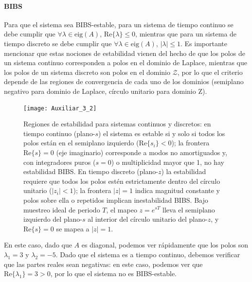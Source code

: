 \documentclass[
  11pt,
  letterpaper,
   addpoints,
   answers
  ]{exam}
\begin{document}
\begin{questions}
\begin{solution}
\paragraph*{BIBS}
Para que el sistema sea BIBS-estable, para un sistema de tiempo continuo se debe cumplir que $\forall \lambda \in \mathrm{eig}(A)$, $\mathrm{Re}\{\lambda\}\le 0$, mientras que para un sistema de tiempo discreto se debe cumplir que $\forall \lambda \in \mathrm{eig}(A)$, $|\lambda|\le 1$. Es importante mencionar que estas nociones de estabilidad vienen del hecho de que los polos de un sistema continuo corresponden a polos en el dominio de Laplace, mientras que los polos de un sistema discreto son polos en el dominio $\mathcal{Z}$, por lo que el criterio depende de las regiones de convergencia de cada uno de los dominios (semiplano negativo para dominio de Laplace, círculo unitario para dominio Z).

\begin{figure}[H]
  \centering
  \texttt{[image: Auxiliar\_3\_2]}
  \caption{Regiones de estabilidad para sistemas continuos y discretos: en tiempo continuo (plano-$s$) el sistema es estable si y solo si todos los polos están en el semiplano izquierdo ($\mathrm{Re}\{s_i\}<0$); la frontera $\mathrm{Re}\{s\}=0$ (eje imaginario) corresponde a modos no amortiguados y, con integradores puros ($s=0$) o multiplicidad mayor que 1, no hay estabilidad BIBS. En tiempo discreto (plano-$z$) la estabilidad requiere que todos los polos estén estrictamente dentro del círculo unitario ($|z_i|<1$); la frontera $|z|=1$ indica magnitud constante y polos sobre ella o repetidos implican inestabilidad BIBS. Bajo muestreo ideal de periodo $T$, el mapeo $z=e^{sT}$ lleva el semiplano izquierdo del plano-$s$ al interior del círculo unitario del plano-$z$, y $\mathrm{Re}\{s\}=0$ se mapea a $|z|=1$.}
  \label{fig:region_estabilidad}
\end{figure}

En este caso, dado que $A$ es diagonal, podemos ver rápidamente que los polos son $\lambda_1=3$ y $\lambda_2=-5$. Dado que el sistema es a tiempo continuo, debemos verificar que las partes reales sean negativas: en este caso, podemos ver que $\mathrm{Re}\{\lambda_1\}=3>0$, por lo que el sistema no es BIBS-estable.


\end{solution}
\end{questions}
\end{document}
